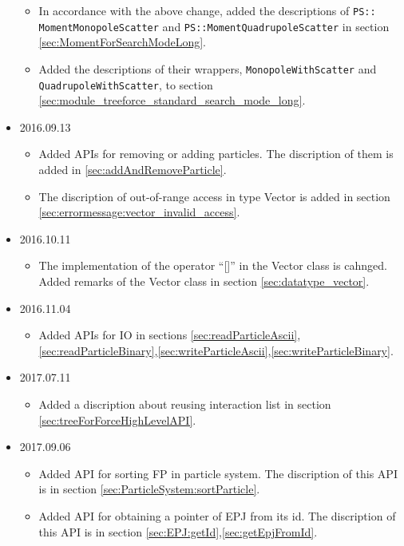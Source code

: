 \begin{itemize}
\begin{itemize}
  \item In accordance with the above change, added the descriptions of 
    \texttt{PS:: MomentMonopoleScatter} and
    \texttt{PS::MomentQuadrupoleScatter} in 
    section  \ref{sec:MomentForSearchModeLong}.

  \item Added the descriptions of their wrappers,
    \texttt{MonopoleWithScatter} 
    and 
    \texttt{QuadrupoleWithScatter},
    to section  \ref{sec:module_treeforce_standard_search_mode_long}.

  \end{itemize}


  \item 2016.09.13
  \begin{itemize}
  \item Added APIs for removing or adding particles. The discription
    of them is added in \ref{sec:addAndRemoveParticle}.
  \item The discription of out-of-range access in type Vector is added
    in section \ref{sec:errormessage:vector_invalid_access}.
  \end{itemize}

    \item 2016.10.11
  \begin{itemize}
  \item The implementation of the operator ``[]'' in the Vector class
    is cahnged. Added remarks of the Vector class in section \ref{sec:datatype_vector}.
  \end{itemize}

  \item 2016.11.04
  \begin{itemize}
  \item Added APIs for IO in sections
    \ref{sec:readParticleAscii},\ref{sec:readParticleBinary},\ref{sec:writeParticleAscii},\ref{sec:writeParticleBinary}.
  \end{itemize}

    \item 2017.07.11
  \begin{itemize}
  \item Added a discription about reusing interaction list in section
    \ref{sec:treeForForceHighLevelAPI}.
  \end{itemize}

    \item 2017.09.06
  \begin{itemize}
  \item Added API for sorting FP in particle system. The discription of this API is in section
    \ref{sec:ParticleSystem:sortParticle}.
  \item Added API for obtaining a pointer of EPJ from its id. The
    discription of this API is in section
    \ref{sec:EPJ:getId},\ref{sec:getEpjFromId}.
  \end{itemize}


\end{itemize}
